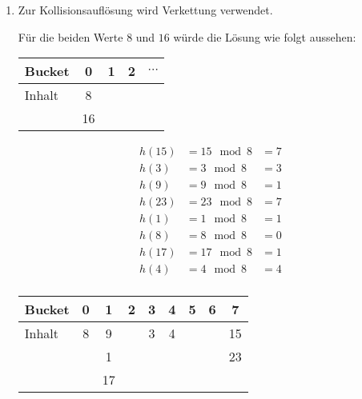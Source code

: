 \documentclass{bschlangaul-aufgabe}
\begin{document}
\begin{enumerate}


\item {}

Zur Kollisionsauflösung wird Verkettung
verwendet.


Für die beiden Werte $8$ und $16$ würde die Lösung wie folgt aussehen:

\begin{center}
\begin{tabular}{l|cccc}
Bucket    & 0  & 1      & 2 & $\cdots$ \\\hline
Inhalt    & 8 \\
          & 16 \\
\end{tabular}
\end{center}

\begin{bAntwort}
{\footnotesize
\begin{equation*}
\begin{aligned}
h(15) &= 15 \mod 8 &= 7\\
h(3)  &= 3 \mod 8  &= 3\\
h(9)  &= 9 \mod 8  &= 1\\
h(23) &= 23 \mod 8 &= 7\\
h(1)  &= 1 \mod 8  &= 1\\
h(8)  &= 8 \mod 8  &= 0\\
h(17) &= 17 \mod 8 &= 1\\
h(4)  &= 4 \mod 8  &= 4\\
\end{aligned}
\end{equation*}}

\begin{center}
\begin{tabular}{l|cccccccc}
Bucket & 0 & 1 & 2 & 3 & 4 & 5 & 6 & 7  \\\hline
Inhalt & 8 & 9 &   & 3 & 4 &   &   & 15 \\
       &   & 1 &   &   &   &   &   & 23 \\
       &   & 17 &  &   &   &   &   &    \\
\end{tabular}
\end{center}
\end{bAntwort}



\end{enumerate}
\end{document}
